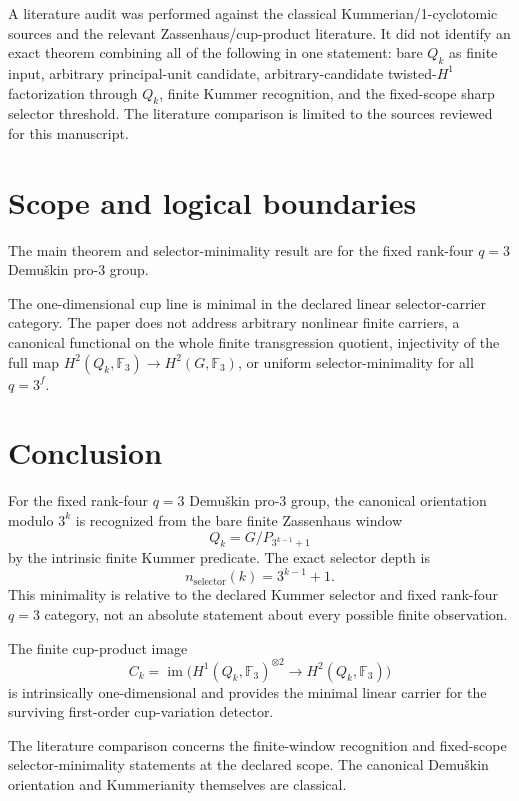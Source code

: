 \documentclass[11pt]{article}
\begin{document}
A literature audit was performed against the classical
Kummerian/1-cyclotomic sources and the relevant Zassenhaus/cup-product
literature. It did not identify an exact theorem combining all of the
following in one statement: bare $Q_k$ as finite input, arbitrary
principal-unit candidate, arbitrary-candidate twisted-$H^1$ factorization
through $Q_k$, finite Kummer recognition, and the fixed-scope sharp
selector threshold. The literature comparison is limited to the sources reviewed for this manuscript.

\section{Scope and logical boundaries}

The main theorem and selector-minimality result are for the fixed rank-four
$q=3$ Demu\v{s}kin pro-$3$ group.

The one-dimensional cup line is minimal in the declared linear selector-carrier category. The paper does not address arbitrary nonlinear finite carriers, a canonical functional on the whole finite transgression quotient, injectivity of the full map $H^2(Q_k,\mathbb F_3)\to H^2(G,\mathbb F_3)$, or uniform selector-minimality for all $q=3^f$.

\section{Conclusion}

For the fixed rank-four $q=3$ Demu\v{s}kin pro-$3$ group, the canonical
orientation modulo $3^k$ is recognized from the bare finite Zassenhaus
window
\[
Q_k=G/P_{3^{k-1}+1}
\]
by the intrinsic finite Kummer predicate. The exact selector depth is
\[
\boxed{
n_{\mathrm{selector}}(k)=3^{k-1}+1.
}
\]
This minimality is relative to the declared Kummer selector and fixed
rank-four $q=3$ category, not an absolute statement about every possible
finite observation.

The finite cup-product image
\[
C_k=\operatorname{im}\bigl(
H^1(Q_k,\mathbb F_3)^{\otimes2}\to H^2(Q_k,\mathbb F_3)
\bigr)
\]
is intrinsically one-dimensional and provides the minimal linear carrier
for the surviving first-order cup-variation detector.

The literature comparison concerns the finite-window recognition and
fixed-scope selector-minimality statements at the declared scope. The
canonical Demu\v{s}kin orientation and Kummerianity themselves are classical.

\appendix
\end{document}
